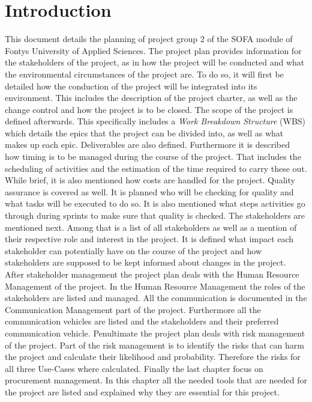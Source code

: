  \section{Introduction}
\label{sec:introduction}
This document details the planning of project group 2 of the SOFA module of Fontys University of Applied Sciences. The project plan provides information for the stakeholders of the project, as in how the project will be conducted and what the environmental circumstances of the project are.
\newline
To do so, it will first be detailed how the conduction of the project will be integrated into its environment. This includes the description of the project charter, as well as the change control and how the project is to be closed.
\newline
The scope of the project is defined afterwards. This specifically includes a \textit{Work Breakdown Structure} (WBS) which details the epics that the project can be divided into, as well as what makes up each epic. Deliverables are also defined.
\newline
Furthermore it is described how timing is to be managed during the course of the project. That includes the scheduling of activities and the estimation of the time required to carry these out. While brief, it is also mentioned how costs are handled for the project.
\newline
Quality assurance is covered as well. It is planned who will be checking for quality and what tasks will be executed to do so. It is also mentioned what steps activities go through during sprints to make sure that quality is checked.
\newline
The stakeholders are mentioned next. Among that is a list of all stakeholders as well as a mention of their respective role and interest in the project. It is defined what impact each stakeholder can potentially have on the course of the project and how stakeholders are supposed to be kept informed about changes in the project.
\newline
After stakeholder management the project plan deals with the Human Resource Management of the project. In the Human Resource Management the roles of the stakeholders are listed and managed.
\newline
All the communication is documented in the Communication Management part of the project. Furthermore all the communication vehicles are listed and the stakeholders and their preferred communication vehicle. 
\newline
Penultimate the project plan deals with risk management of the project. Part of the risk management is to identify the risks that can harm the project and calculate their likelihood and probability. Therefore the risks for all three Use-Cases where calculated. 
\newline
Finally the last chapter focus on procurement management. In this chapter all the needed tools that are needed for the project are listed and explained why they are essential for this project. 